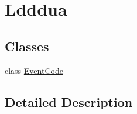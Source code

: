 \hypertarget{group___ldddua}{}\section{Ldddua}
\label{group___ldddua}
\subsection*{Classes}
\begin{DoxyCompactItemize}
\item 
class \hyperlink{class_event_code}{Event\+Code}
\end{DoxyCompactItemize}


\subsection{Detailed Description}
